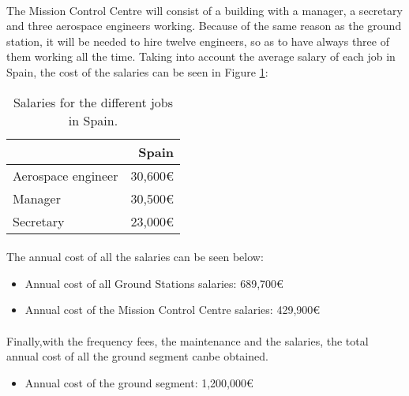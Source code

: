 \paragraph{}The Mission Control Centre will consist of a building with a manager, a secretary and three aerospace engineers working. Because of the same reason as the ground station, it will be needed to hire twelve engineers, so as to have always three of them working all the time. Taking into account the average salary of each job in Spain, the cost of the salaries can be seen in Figure \ref{table:SalariesSpain}:

\begin{table}[H]
\begin{center}
\begin{tabular}{|l|r|}
\hline 
 & Spain \\ 
\hline 
Aerospace engineer & 30,600\euro \\ 
\hline 
Manager & 30,500\euro  \\ 
\hline 
Secretary & 23,000\euro  \\ 
\hline 
\end{tabular}
\end{center}
\caption[Salaries in Spain]{Salaries for the different jobs in Spain.}
\label{table:SalariesSpain}
\end{table}

\paragraph{}The annual cost of all the salaries can be seen below:
\begin{itemize}
\item Annual cost of all Ground Stations salaries: 689,700\euro
\item Annual cost of the Mission Control Centre salaries: 429,900\euro
\end{itemize}

\paragraph{}Finally,with the frequency fees, the maintenance and the salaries, the total annual cost of all the ground segment canbe obtained.
\begin{itemize}
\item Annual cost of the ground segment: 1,200,000\euro
\end{itemize}
